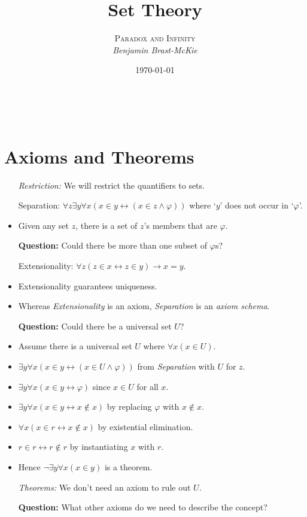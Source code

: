 \documentclass[a4paper, 11pt]{article} %
\title{\textbf{Set Theory}} %
\author{\textsc{Paradox and Infinity}\\ \em Benjamin Brast-McKie} %
\date{\today} %
\makeatletter
\renewcommand{\maketitle}{ %
\begin{flushright} %
{\LARGE\@title} %

\vspace{10pt} %

{\@author} %
\\\@date %

\vspace{-20pt} %
\end{flushright}
}
\makeatother
\begin{document}
\maketitle %

\thispagestyle{empty}




\section*{Axioms and Theorems}

  \begin{itemize}
    \item[\it Restriction:] We will restrict the quantifiers to sets.
    \item[\sc Separation:] $\forall z\exists y\forall x(x \in y \leftrightarrow (x \in z \wedge \varphi))$ where `$y$' does not occur in `$\varphi$'.
      \item Given any set $z$, there is a set of $z$'s members that are $\varphi$.
    \item[\bf Question:] Could there be more than one subset of $\varphi$s? 
    \item[\sc Extensionality:] $\forall z(z \in x \leftrightarrow z \in y) \rightarrow x = y$.
      \item Extensionality guarantees uniqueness.
      \item Whereas \textit{Extensionality} is an axiom, \textit{Separation} is an \textit{axiom schema}.
    \item[\bf Question:] Could there be a universal set $U$?
      \item Assume there is a universal set $U$ where $\forall x(x \in U)$.
      \item $\exists y\forall x(x \in y \leftrightarrow (x \in U \wedge \varphi))$ from \textit{Separation} with $U$ for $z$.
      \item $\exists y\forall x(x \in y \leftrightarrow \varphi)$ since $x \in U$ for all $x$.
      \item $\exists y\forall x(x \in y \leftrightarrow x \notin x)$ by replacing $\varphi$ with $x \notin x$.
      \item $\forall x(x \in r \leftrightarrow x \notin x)$ by existential elimination.
      \item $r \in r \leftrightarrow r \notin r$ by instantiating $x$ with $r$.
      \item Hence $\neg \exists y \forall x(x \in y)$ is a theorem.
    \item[\it Theorems:] We don't need an axiom to rule out $U$.
    \item[\bf Question:] What other axioms do we need to describe the concept?
  \end{itemize}
\end{document}
